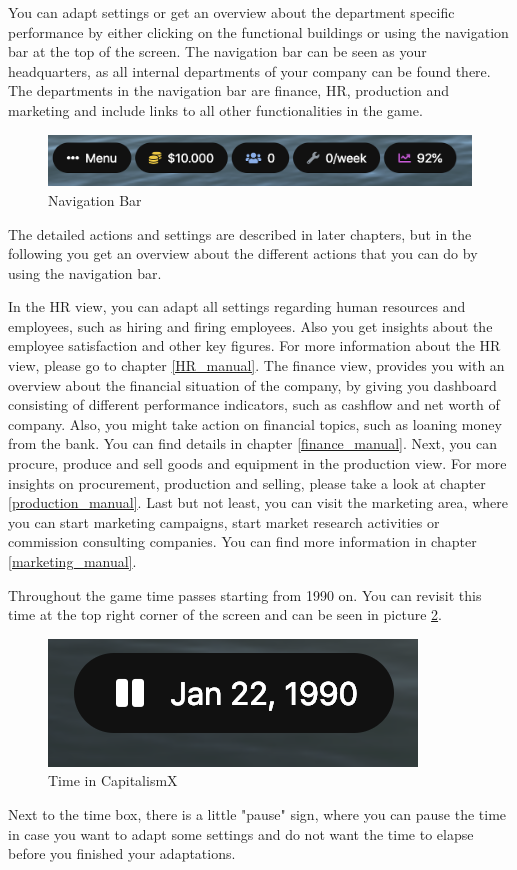 \documentclass[11pt,titlepage,oneside,openany]{book}
\begin{document}
You can adapt settings or get an overview about the department specific performance by either clicking on the functional buildings or using the navigation bar at the top of the screen. The navigation bar can be seen as your headquarters, as all internal departments of your company can be found there. The departments in the navigation bar are finance, HR, production and marketing and include links to all other functionalities in the game. 
\begin{figure} [!htbp]
    \centering
    \includegraphics [width=\textwidth]{images/navigationBar.png}
    \caption{Navigation Bar}
    \label{fig:navigationBar}
\end{figure} The detailed actions and settings are described in later chapters, but in the following you get an overview about the different actions that you can do by using the navigation bar.

In the HR view, you can adapt all settings regarding human resources and employees, such as hiring and firing employees. Also you get insights about the employee satisfaction and other key figures. For more information about the HR view, please go to chapter \ref{HR_manual}.
The finance view, provides you with an overview about the financial situation of the company, by giving you dashboard consisting of different performance indicators, such as cashflow and net worth of company. Also, you might take action on financial topics, such as loaning money from the bank. You can find details in chapter \ref{finance_manual}.
Next, you can procure, produce and sell goods and equipment in the production view. For more insights on procurement, production and selling, please take a look at chapter \ref{production_manual}. 
Last but not least, you can visit the marketing area, where you can start marketing campaigns, start market research activities or commission consulting companies. You can find more information in chapter \ref{marketing_manual}.

Throughout the game time passes starting from 1990 on. You can revisit this time at the top right corner of the screen and can be seen in picture \ref{fig:time}.
\begin{figure} [!htbp]
    \centering
    \includegraphics{images/time.png}
    \caption{Time in CapitalismX}
    \label{fig:time}
\end{figure}
Next to the time box, there is a little "pause" sign, where you can pause the time in case you want to adapt some settings and do not want the time to elapse before you finished your adaptations.
\end{document}
